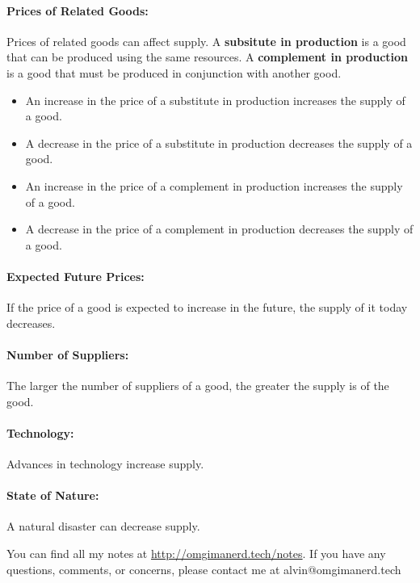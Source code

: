 \documentclass[letterpaper, 12pt]{article}
\begin{document}
\paragraph{Prices of Related Goods:}
Prices of related goods can affect supply. A \textbf{subsitute in production}
is a good that can be produced using the same resources. A \textbf{complement
in production} is a good that must be produced in conjunction with another
good.
\begin{itemize}
  \item An increase in the price of a substitute in production increases the
        supply of a good.
  \item A decrease in the price of a substitute in production decreases the
        supply of a good.
  \item An increase in the price of a complement in production increases the
        supply of a good.
  \item A decrease in the price of a complement in production decreases the
        supply of a good.
\end{itemize}

\paragraph{Expected Future Prices:}
If the price of a good is expected to increase in the future, the supply of it
today decreases.

\paragraph{Number of Suppliers:}
The larger the number of suppliers of a good, the greater the supply is of the
good.

\paragraph{Technology:}
Advances in technology increase supply.

\paragraph{State of Nature:}
A natural disaster can decrease supply.

\begin{center}
  You can find all my notes at \url{http://omgimanerd.tech/notes}. If you have
  any questions, comments, or concerns, please contact me at
  alvin@omgimanerd.tech
\end{center}
\end{document}
